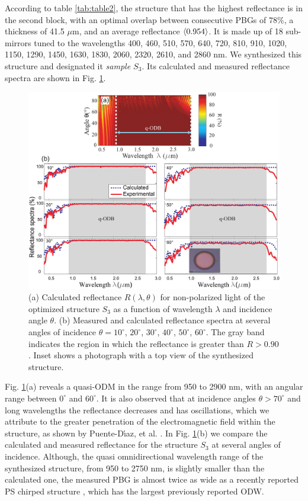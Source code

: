 \documentclass[a4paper,fleqn]{cas-sc}
\begin{document}
	According to table \ref{tab:table2}, the structure that has the highest
	reflectance is in the second block, with an optimal overlap between
	consecutive PBGs of $78\%$, a thickness of
	41.5 $\mu$m, and an average reflectance $\braket{0.954}$. It is made up
	of 18 sub-mirrors tuned to the wavelengths
	400, 460, 510, 570, 640, 720, 810, 910, 1020, 1150, 1290, 1450,
	1630, 1830, 2060, 2320, 2610, and 2860 nm.
	We synthesized this structure and designated it {\em sample $S_3$}.
	Its calculated and measured
	reflectance spectra are shown in Fig. \ref{Fig3}.
	\begin{figure}
		\begin{center}
			\includegraphics[width=\textwidth]
			{F3Alternativa.pdf}
		\end{center}
		\caption{ (a) Calculated reflectance $R(\lambda,\theta)$ for non-polarized light of the optimized structure $S_3$
			as a function of wavelength $\lambda$ and incidence angle
			$\theta$. (b) Measured and calculated reflectance spectra at several
			angles of incidence $\theta=10^\circ$, $20^\circ$,
			$30^\circ$, $40^\circ$, $50^\circ$, $60^\circ$. The gray band indicates
			the region in which the reflectance is greater than $R>0.90$.  Inset shows a
			photograph with a top view of the synthesized structure.}
		\label{Fig3}
	\end{figure}
	
	Fig. \ref{Fig3}(a) reveals a quasi-ODM
	in the range from 950 to 2900 nm, with an angular range between $0^\circ$ and
	$60^\circ$. It is also observed that at incidence angles $\theta
	>70^\circ$ and long
	wavelengths the reflectance decreases and has oscillations, which we attribute to the
	greater penetration of the electromagnetic field within the structure, as shown by
	Puente-D\'{\i}az, et al. \cite{Puente2020}. In Fig. \ref{Fig3}(b) we compare the
	calculated and measured reflectance for the structure $S_3$ at several angles of
	incidence. Although, the quasi omnidirectional wavelength range of
	the synthesized structure, from 950 to 2750 nm, is slightly smaller than the calculated
	one, the measured PBG is almost twice as wide
	as a recently reported PS chirped structure \cite{Chavez2020}, which
	has the largest previously reported ODW.
	
\end{document}
